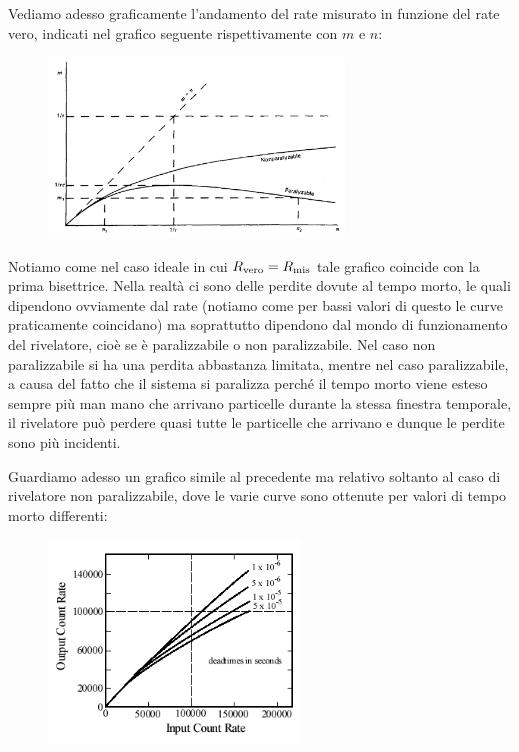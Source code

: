 Vediamo adesso graficamente l'andamento del rate misurato in funzione del rate vero, indicati nel grafico seguente rispettivamente con $m$ e $n$:
\begin{figure}[H]
   \centering
   \includegraphics[width=0.7\textwidth]{immagini/rate_vero_e_rate_misurato.png}
\end{figure}
Notiamo come nel caso ideale in cui $R_{\rm vero}=R_{\rm mis}$ tale grafico coincide con la prima bisettrice. Nella realtà ci sono delle perdite dovute al tempo morto, le quali dipendono ovviamente dal rate (notiamo come per bassi valori di questo le curve praticamente coincidano) ma soprattutto dipendono dal mondo di funzionamento del rivelatore, cioè se è paralizzabile o non paralizzabile. Nel caso non paralizzabile si ha una perdita abbastanza limitata, mentre nel caso paralizzabile, a causa del fatto che il sistema si paralizza perché il tempo morto viene esteso sempre più man mano che arrivano particelle durante la stessa finestra temporale, il rivelatore può perdere quasi tutte le particelle che arrivano e dunque le perdite sono più incidenti.

Guardiamo adesso un grafico simile al precedente ma relativo soltanto al caso di rivelatore non paralizzabile, dove le varie curve sono ottenute per valori di tempo morto differenti:

\begin{figure}[H]
   \centering
   \includegraphics[width=0.6\textwidth]{immagini/rate_vero_e_rate_misurato_caso_non_paralizzabile.png}
\end{figure}

